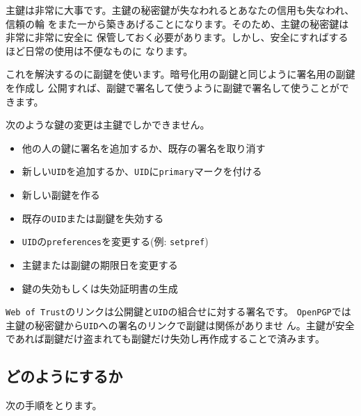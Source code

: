 \documentclass[mingoth,a4paper]{jsarticle}
\begin{document}
主鍵は非常に大事です。主鍵の秘密鍵が失なわれるとあなたの信用も失なわれ、信頼の輪
をまた一から築きあげることになります。そのため、主鍵の秘密鍵は非常に非常に安全に
保管しておく必要があります。しかし、安全にすればするほど日常の使用は不便なものに
なります。

これを解決するのに副鍵を使います。暗号化用の副鍵と同じように署名用の副鍵を作成し
公開すれば、副鍵で署名して使うように副鍵で署名して使うことができます。

次のような鍵の変更は主鍵でしかできません。

\begin{itemize}
\item 他の人の鍵に署名を追加するか、既存の署名を取り消す
\item 新しい{\tt UID}を追加するか、{\tt UID}に{\tt primary}マークを付ける
\item 新しい副鍵を作る
\item 既存の{\tt UID}または副鍵を失効する
\item {\tt UID}の{\tt preferences}を変更する(例: {\tt setpref})
\item 主鍵または副鍵の期限日を変更する
\item 鍵の失効もしくは失効証明書の生成
\end{itemize}

{\tt Web of Trust}のリンクは公開鍵と{\tt UID}の組合せに対する署名です。
{\tt OpenPGP}では主鍵の秘密鍵から{\tt UID}への署名のリンクで副鍵は関係がありませ
ん。主鍵が安全であれば副鍵だけ盗まれても副鍵だけ失効し再作成することで済みます。


\subsection{どのようにするか}

次の手順をとります。
\end{document}
